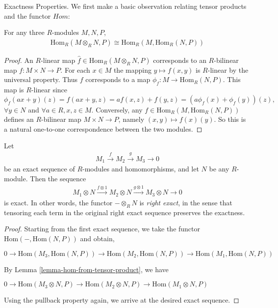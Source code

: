 \noindent
Exactness Properties.
We first make a basic observation relating tensor products and
the functor $Hom$:

\begin{lemma}
\label{lemma-hom-from-tensor-product}
For any three $R$-modules $M, N, P$,
\begin{align}
\text{Hom}_R(M\otimes_R N, P)\cong \text{Hom}_R(M, \text{Hom}_R(N, P))
\end{align}
\end{lemma}

\begin{proof}
An $R$-linear map $\hat{f}\in \text{Hom}_R(M\otimes_R N, P)$ corresponds to an
$R$-bilinear map $f : M\times N\rightarrow P$. For
each $x\in M$ the mapping $y\mapsto f(x, y)$ is $R$-linear by the universal
property. Thus $f$ corresponds to a
map $\phi_f : M\rightarrow \text{Hom}_R(N, P)$. This map is $R$-linear since
$$
\phi_f(ax + y)(z) = f(ax + y, z) = af(x, z)+f(y, z) = (a\phi_f(x)+\phi_f(y))(z),
$$
$\forall y\in N$ and $\forall a\in R, x, z\in M$. Conversely, any
$f\in\text{Hom}_R(M, \text{Hom}_R(N, P))$ defines an $R$-bilinear
map $M\times N\rightarrow P$, namely $(x, y)\mapsto f(x)(y)$.
So this is a natural one-to-one correspondence between the
two modules.
\end{proof}

\begin{lemma}
\label{lemma-tensor-product-exact}
Let
\begin{align}
M_1\xrightarrow{f} M_2\xrightarrow{g} M_3\rightarrow 0
\end{align}
be an exact sequence of $R$-modules and homomorphisms, and let $N$ be any
$R$-module. Then the sequence
\begin{align}
\label{equation-2ndex}
M_1\otimes N\xrightarrow{f\otimes 1} M_2\otimes N \xrightarrow{g\otimes 1}
M_3\otimes N\rightarrow 0
\end{align}
is exact. In other words, the functor $- \otimes_{R} N$ is \textit{right
exact}, in the sense that tensoring
each term in the original right exact sequence preserves the exactness.
\end{lemma}

\begin{proof}
Starting from the first exact sequence, we take the functor
$\text{Hom}(-, \text{Hom}(N, P))$ and obtain,
\begin{center}
$
0\rightarrow
\text{Hom}(M_3, \text{Hom}(N, P))\rightarrow
\text{Hom}(M_2, \text{Hom}(N, P))\rightarrow
\text{Hom}(M_1, \text{Hom}(N, P))$
\end{center}
By Lemma \ref{lemma-hom-from-tensor-product}, we have
\begin{center}
$0\rightarrow\text{Hom}(M_3\otimes N, P)\rightarrow\text{Hom}(M_2\otimes
N, P)\rightarrow\text{Hom}(M_1\otimes N, P)$
\end{center}
Using the pullback property again, we arrive at the desired exact sequence.
\end{proof}

